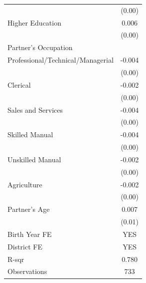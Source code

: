 \begin{longtable}{l*{1}{c}}
                    & (0.00) \\
\hspace{1em}Higher Education & 0.006 \\
                    & (0.00) \\
\multicolumn{2}{l}{Partner's Occupation} \\
\hspace{1em}Professional/Technical/Managerial & -0.004 \\
                    & (0.00) \\
\hspace{1em}Clerical & -0.002 \\
                    & (0.00) \\
\hspace{1em}Sales and Services & -0.004\sym{*} \\
                    & (0.00) \\
\hspace{1em}Skilled Manual & -0.004\sym{**} \\
                    & (0.00) \\
\hspace{1em}Unskilled Manual & -0.002 \\
                    & (0.00) \\
\hspace{1em}Agriculture & -0.002 \\
                    & (0.00) \\
Partner's Age & 0.007 \\
                    & (0.01) \\
\hline
Birth Year FE & YES \\
District FE & YES \\
R-sqr & 0.780 \\
Observations & 733 \\
\hline \hline

\end{longtable}